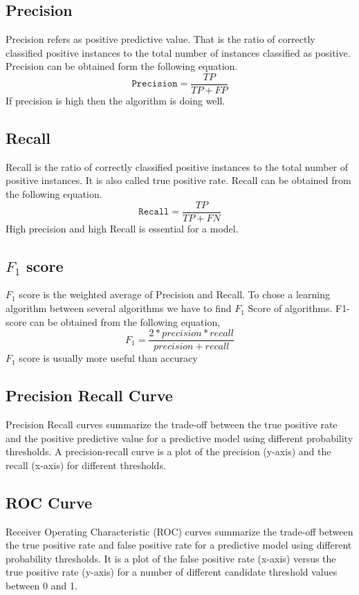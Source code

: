 \subsection{Precision}
Precision refers as positive predictive value. That is the ratio of correctly classified positive instances to the total number of instances classified as positive. Precision can be obtained form  the following equation.
\begin{equation}
    \texttt{Precision} = \frac{TP}{TP+FP}
\end{equation}
If precision is high then the algorithm is doing well.

\subsection{Recall}
Recall is the ratio of correctly classified positive instances to the total number of positive instances. It is also called true positive rate. Recall can be obtained from the following equation.
\begin{equation}
    \texttt{Recall} = \frac{TP}{TP+FN}
\end{equation}
High precision and high Recall is essential for a model.

\subsection{$F_1$ score}
 $F_1$ score is the weighted average of Precision and Recall. To chose a learning algorithm between several algorithms we have to find $F_1$ Score of algorithms. F1-score can be obtained from the following equation,
 \begin{equation}
     F_1 = \frac{2*precision*recall}{precision+recall}
 \end{equation}
$F_1$ score is usually more useful than accuracy

\subsection{Precision Recall Curve}
Precision Recall curves summarize the trade-off between the true positive rate and the positive predictive value for a predictive model using different probability thresholds. A precision-recall curve is a plot of the precision (y-axis) and the recall (x-axis) for different thresholds.
\subsection{ROC Curve}
Receiver Operating Characteristic (ROC) curves summarize the trade-off between the true positive rate and false positive rate for a predictive model using different probability thresholds.%
It is a plot of the false positive rate (x-axis) versus the true positive rate (y-axis) for a number of different candidate threshold values between 0 and 1.